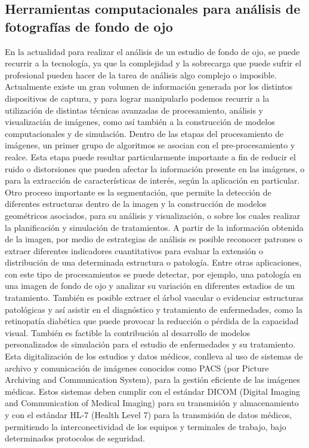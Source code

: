 \subsection{Herramientas computacionales para an\'alisis de fotograf\'ias de fondo de ojo}
En la actualidad para realizar el an\'alisis de un  estudio de fondo de ojo, se puede recurrir a la tecnolog\'ia, ya que la complejidad y la sobrecarga que puede sufrir el profesional pueden hacer de la tarea de an\'alisis algo complejo o imposible. Actualmente existe un gran volumen de informaci\'on generada por los distintos dispositivos de captura, y para lograr manipularlo podemos recurrir a la utilizaci\'on de distintas t\'ecnicas avanzadas de procesamiento, an\'alisis y visualizaci\'an de im\'agenes, como as\'i tambi\'en a la construcci\'on de modelos computacionales y de simulaci\'on.
Dentro de las etapas del procesamiento de im\'agenes, un primer grupo de algoritmos se asocian con el pre-procesamiento y realce. Esta etapa puede resultar particularmente importante a fin de reducir el ruido o distorsiones que pueden afectar la informaci\'on presente en las im\'agenes, o para la extracci\'on de caracter\'isticas de inter\'es, seg\'un la aplicaci\'on en particular. Otro proceso importante es la segmentaci\'on, que permite la detecci\'on de diferentes estructuras dentro de la imagen y la construcci\'on de modelos geom\'etricos asociados, para su an\'alisis y visualizaci\'on, o sobre los cuales realizar la planificaci\'on y simulaci\'on de tratamientos. A partir de la informaci\'on obtenida de la imagen, por medio de estrategias de an\'alisis es posible reconocer patrones o extraer diferentes indicadores cuantitativos para evaluar la extensi\'on o distribuci\'on de una determinada estructura o patolog\'ia.
Entre otras aplicaciones, con este tipo de procesamientos se puede detectar, por ejemplo, una patolog\'ia en una imagen de fondo de ojo y analizar su variaci\'on en diferentes estadios de un tratamiento. Tambi\'en es posible extraer el \'arbol vascular o evidenciar estructuras patol\'ogicas y as\'i asistir en el diagn\'ostico y tratamiento de enfermedades, como la retinopat\'ia diab\'etica que puede provocar la reducci\'on o p\'erdida de la capacidad visual. Tambi\'en es factible la contribuci\'on al desarrollo de modelos personalizados de simulaci\'on para el estudio de enfermedades y su tratamiento.
 Esta digitalizaci\'on de los estudios y datos m\'edicos, conlleva al uso de sistemas de archivo y comunicaci\'on de im\'agenes conocidos como PACS (por Picture Archiving and Communication System), para la gesti\'on eficiente de las im\'agenes m\'edicas. Estos sistemas deben cumplir con el est\'andar DICOM (Digital Imaging and Communication of Medical Imaging) para su transmisi\'on y almacenamiento y con el est\'andar HL-7 (Health Level 7) para la transmisi\'on de datos m\'edicos, permitiendo la interconectividad de los equipos y terminales de trabajo, bajo determinados protocolos de seguridad.
